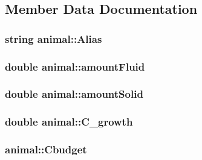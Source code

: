 \subsection{Member Data Documentation}
\hypertarget{classanimal_acb5645f84affade5748c1cd8cf28a6f1}{
\subsubsection[{Alias}]{\setlength{\rightskip}{0pt plus 5cm}string {\bf animal::Alias}}}
\label{classanimal_acb5645f84affade5748c1cd8cf28a6f1}
\hypertarget{classanimal_a980913ef37036f30fdd2a743f190ad7c}{
\subsubsection[{amountFluid}]{\setlength{\rightskip}{0pt plus 5cm}double {\bf animal::amountFluid}}}
\label{classanimal_a980913ef37036f30fdd2a743f190ad7c}
\hypertarget{classanimal_ae574d91108a470dd180278e787c95cb0}{
\subsubsection[{amountSolid}]{\setlength{\rightskip}{0pt plus 5cm}double {\bf animal::amountSolid}}}
\label{classanimal_ae574d91108a470dd180278e787c95cb0}
\hypertarget{classanimal_a029e384f9d14c602ca4569cd7928c6f7}{
\subsubsection[{C\_\-growth}]{\setlength{\rightskip}{0pt plus 5cm}double {\bf animal::C\_\-growth}}}
\label{classanimal_a029e384f9d14c602ca4569cd7928c6f7}
\hypertarget{classanimal_a628e470a01f24baba08845a760574fa5}{
\subsubsection[{Cbudget}]{ {\bf animal::Cbudget}}}
